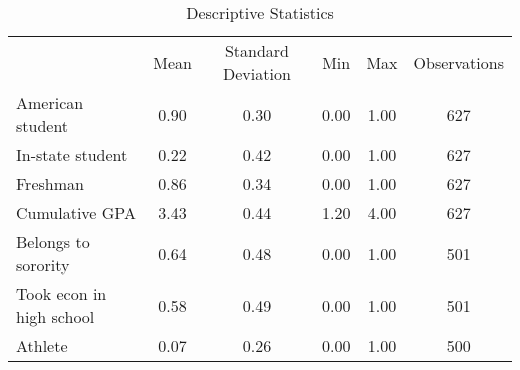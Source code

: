 \begin{table}
\caption{Descriptive Statistics}
\begin{tabular}{lccccc}
 & Mean & Standard Deviation & Min & Max & Observations \\
American student & 0.90 & 0.30 & 0.00 & 1.00 & 627 \\
In-state student & 0.22 & 0.42 & 0.00 & 1.00 & 627 \\
Freshman & 0.86 & 0.34 & 0.00 & 1.00 & 627 \\
Cumulative GPA & 3.43 & 0.44 & 1.20 & 4.00 & 627 \\
Belongs to sorority & 0.64 & 0.48 & 0.00 & 1.00 & 501 \\
Took econ in high school & 0.58 & 0.49 & 0.00 & 1.00 & 501 \\
Athlete & 0.07 & 0.26 & 0.00 & 1.00 & 500 \\
\end{tabular}
\end{table}
